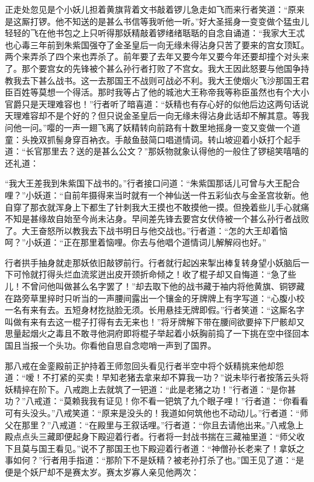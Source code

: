 \documentclass[12pt,UTF8]{ctexbook}
\begin{document}
正走处忽见是个小妖儿担着黄旗背着文书敲着锣儿急走如飞而来行者笑道：“原来是这厮打锣。他不知送的是甚么书信等我听他一听。”好大圣摇身一变变做个猛虫儿轻轻的飞在他书包之上只听得那妖精敲着锣绪绪聒聒的自念自诵道：“我家大王忒也心毒三年前到朱紫国强夺了金圣皇后一向无缘未得沾身只苦了要来的宫女顶缸。两个来弄杀了四个来也弄杀了。前年要了去年又要今年又要今年还要却撞个对头来了。那个要宫女的先锋被个甚么孙行者打败了不宫女。我大王因此怒要与他国争持教我去下甚么战书。这一去那国王不战则可战必不利。我大王使烟火飞沙那国王君臣百姓等莫想一个得活。那时我等占了他的城池大王称帝我等称臣虽然也有个大小官爵只是天理难容也！”行者听了暗喜道：“妖精也有存心好的似他后边这两句话说天理难容却不是个好的？但只说金圣皇后一向无缘未得沾身此话却不解其意。等我问他一问。”嘤的一声一翅飞离了妖精转向前路有十数里地摇身一变又变做一个道童：头挽双抓髻身穿百衲衣。手敲鱼鼓简口唱道情词。转山坡迎着小妖打个起手道：“长官那里去？送的是甚么公文？”那妖物就象认得他的一般住了锣槌笑嘻嘻的还礼道：

“我大王差我到朱紫国下战书的。”行者接口问道：“朱紫国那话儿可曾与大王配合哩？”小妖道：“自前年摄得来当时就有一个神仙送一件五彩仙衣与金圣宫妆新。他自穿了那衣就浑身上下都生了针刺我大王摸也不敢摸他一摸。但挽着些儿手心就痛不知是甚缘故自始至今尚未沾身。早间差先锋去要宫女伏侍被一个甚么孙行者战败了。大王奋怒所以教我去下战书明日与他交战也。”行者道：“怎的大王却着恼呵？”小妖道：“正在那里着恼哩。你去与他唱个道情词儿解解闷也好。”

行者拱手抽身就走那妖依旧敲锣前行。行者就行起凶来掣出棒复转身望小妖脑后一下可怜就打得头烂血流浆迸出皮开颈折命倾之！收了棍子却又自悔道：“急了些儿！不曾问他叫做甚么名字罢了！”却去取下他的战书藏于袖内将他黄旗、铜锣藏在路旁草里捽时只听当的一声腰间露出一个镶金的牙牌牌上有字写道：“心腹小校一名有来有去。五短身材扢挞脸无须。长用悬挂无牌即假。”行者笑道：“这厮名字叫做有来有去这一棍子打得有去无来也！”将牙牌解下带在腰间欲要捽下尸骸却又思量起烟火之毒且不敢寻他洞府即将棍子举起着小妖胸前捣了一下挑在空中径回本国且当报一个头功。你看他自思自念唿哨一声到了国界。

那八戒在金銮殿前正护持着王师忽回头看见行者半空中将个妖精挑来他却怨道：“嗳！不打紧的买卖！早知老猪去拿来却不算我一功？”说未毕行者按落云头将妖精捽在阶下。八戒跑上去就筑了一钯道：“此是老猪之功！”行者道：“是你甚功？”八戒道：“莫赖我我有证见！你不看一钯筑了九个眼子哩！”行者道：“你看看可有头没头。”八戒笑道：“原来是没头的！我道如何筑他也不动动儿。”行者道：“师父在那里？”八戒道：“在殿里与王叙话哩。”行者道：“你且去请他出来。”八戒急上殿点点头三藏即便起身下殿迎着行者。行者将一封战书揣在三藏袖里道：“师父收下且莫与国王看见。”说不了那国王也下殿迎着行者道：“神僧孙长老来了！拿妖之事如何？”行者用手指道：“那阶下不是妖精？被老孙打杀了也。”国王见了道：“是便是个妖尸却不是赛太岁。赛太岁寡人亲见他两次：
\end{document}
